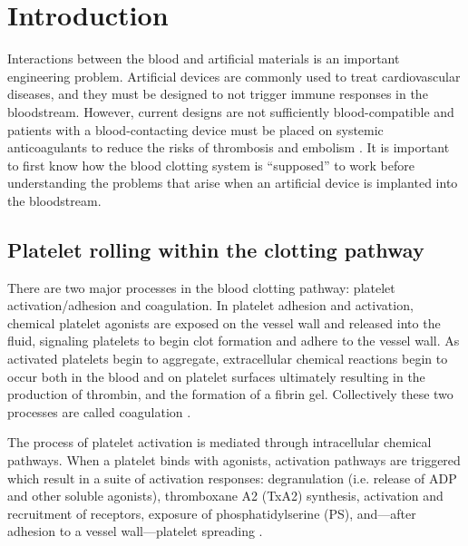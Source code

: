 
\chapter{Introduction}
\label{cha:introduction}


Interactions between the blood and artificial materials is an
important engineering problem. Artificial devices are commonly used to
treat cardiovascular diseases, and they must be designed to not
trigger immune responses in the bloodstream. However, current designs
are not sufficiently blood-compatible and patients with a
blood-contacting device must be placed on systemic anticoagulants to
reduce the risks of thrombosis and embolism
\cite{Ratner1993,Ratner2007,Oprea13}. It is important to first know
how the blood clotting system is ``supposed'' to work before
understanding the problems that arise when an artificial device is
implanted into the bloodstream.
	

\section{Platelet rolling within the clotting pathway}
\label{sec:plat-roll-with}

There are two major processes in the blood clotting pathway: platelet
activation/adhesion and coagulation. In platelet adhesion and
activation, chemical platelet agonists are exposed on the vessel wall
and released into the fluid, signaling platelets to begin clot
formation and adhere to the vessel wall. As activated platelets begin
to aggregate, extracellular chemical reactions begin to occur both in
the blood and on platelet surfaces ultimately resulting in the
production of thrombin, and the formation of a fibrin
gel. Collectively these two processes are called coagulation
\cite{Fogelson2015}. 

The process of platelet activation is mediated through
intracellular chemical pathways. When a platelet binds with agonists,
activation pathways are triggered which result in a suite of
activation responses: degranulation (i.e. release of ADP and other
soluble agonists), thromboxane A2 (TxA2) synthesis, activation and
recruitment of  receptors, exposure of
phosphatidylserine (PS), and---after adhesion to a vessel
wall---platelet spreading \cite{Bye2016}.

